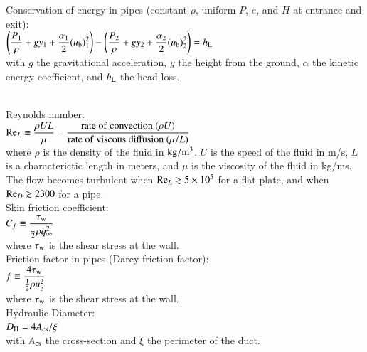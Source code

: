 \documentclass[oneside,onecolumn,a4paper,10pt,notitlepage]{tables}
\newcommand{\mfd}{\displaystyle}
\begin{document}
Conservation of energy in pipes (constant $\rho$, uniform $P$, $e$, and $H$ at entrance and exit):\\[0.5em]
$\mfd \left( \frac{P_1}{\rho} + g y_1 + \frac{\alpha_1}{2} (u_{\rm b})_1^2\right)
-\left( \frac{P_2}{\rho} + g y_2 + \frac{\alpha_2}{2} (u_{\rm b})_2^2\right)=h_{\rm L}$\\[0.5em]
with $g$ the gravitational acceleration, $y$ the height from the ground, $\alpha$ the kinetic energy coefficient, and $h_{\rm L}$ the head loss. \\
~\\

\vfill



Reynolds number: \\[0.4em]
$\mfd {\rm Re}_L \equiv  \frac{\rho U L}{\mu} = \frac{{\rm rate~of~convection}~(\rho U)}{{\rm rate~of~viscous~diffusion}~(\mu/L)}$\\[0.5em]
where $\rho$ is the density of the fluid in $\rm kg/m^3$, $U$ is the speed of the fluid in m/s, $L$ is a characterictic length in meters, and $\mu$ is the viscosity of the fluid in kg/ms. The flow becomes turbulent when  ${\rm Re}_L \gtrsim 5 \times 10^5$ for a flat plate, and when ${\rm Re}_D \gtrsim 2300$ for a pipe.\\
\vfill
Skin friction coefficient: \\[0.4em]
$\mfd C_f \equiv  \frac{\tau_{\rm w}}{\frac{1}{2} \rho q_\infty^2}$ \\[0.5em]
where $\tau_{\rm w}$ is the shear stress at the wall.\\
\vfill
Friction factor in pipes (Darcy friction factor): \\[0.4em]
$\mfd f \equiv  \frac{4 \tau_{\rm w}}{\frac{1}{2} \rho u_{\rm b}^2}$ \\[0.5em]
where $\tau_{\rm w}$ is the shear stress at the wall.\\
\vfill
Hydraulic Diameter:\\[0.5em]
$\mfd D_{\rm H}=4 A_{\rm cs} / \xi$\\[0.5em]
with $A_{\rm cs}$ the cross-section and $\xi$ the perimeter of the duct.\\
\vfill

\newpage
\end{document}
